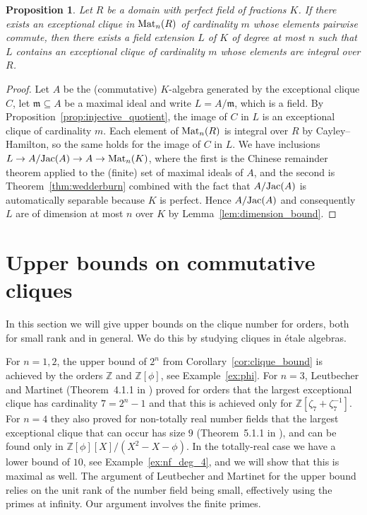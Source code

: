 \documentclass{amsart}
\theoremstyle{plain}
\newtheorem{proposition}[theorem]{Proposition}
\theoremstyle{definition}
\newcommand{\Z}{\ensuremath{\mathbb{Z}}}
\newcommand{\clq}{C}
\begin{document}
\begin{proposition}\label{prop:commutative_clique_to_nf}
	Let \(R\) be a domain with perfect field of fractions \(K\).
	If there exists an exceptional clique in \(\textup{Mat}_n(R)\) of cardinality \(m\) whose elements pairwise commute, then there exists a field extension \(L\) of \(K\) of degree at most \(n\) such that \(L\) contains an exceptional clique of cardinality \(m\) whose elements are integral over \(R\).
\end{proposition}
\begin{proof}
	Let \(A\) be the (commutative) \(K\)-algebra generated by the exceptional clique \(\clq\), let \(\mathfrak{m}\subseteq A\) be a maximal ideal and write \(L=A/\mathfrak{m}\), which is a field.
	By Proposition~\ref{prop:injective_quotient}, the image of \(\clq\) in \(L\) is an exceptional clique of cardinality \(m\).
	Each element of \(\textup{Mat}_n(R)\) is integral over \(R\) by Cayley--Hamilton, so the same holds for the image of \(\clq\) in \(L\).
	We have inclusions \(L \to A/\textup{Jac}(A)\to A \to \textup{Mat}_n(K)\), where the first is the Chinese remainder theorem applied to the (finite) set of maximal ideals of \(A\), and the second is Theorem~\ref{thm:wedderburn} combined with the fact that \(A/\textup{Jac}(A)\) is automatically separable because \(K\) is perfect. 
	Hence \(A/\textup{Jac}(A)\) and consequently \(L\) are of dimension at most \(n\) over \(K\) by Lemma~\ref{lem:dimension_bound}.
\end{proof}


\section{Upper bounds on commutative cliques}\label{sec:uppercommutative}

In this section we will give upper bounds on the clique number for orders, both for small rank and in general. We do this by studying cliques in \'etale algebras.

For \(n=1,2\), the upper bound of \(2^n\) from Corollary~\ref{cor:clique_bound} is achieved by the orders \(\Z\) and \(\Z[\phi]\), see Example~\ref{ex:phi}.
For \(n=3\), Leutbecher and Martinet (Theorem~4.1.1 in \cite{Martinet}) proved for orders that the largest exceptional clique has cardinality \(7=2^n-1\) and that this is achieved only for \(\Z[\zeta_7+\zeta_7^{-1}]\).
For \(n=4\) they also proved for non-totally real number fields that the largest exceptional clique that can occur has size \(9\) (Theorem~5.1.1 in \cite{Martinet}), and can be found only in \(\Z[\phi][X]/(X^2-X-\phi)\). In the totally-real case we have a lower bound of \(10\), see Example~\ref{ex:nf_deg_4}, and we will show that this is maximal as well.
The argument of Leutbecher and Martinet for the upper bound relies on the unit rank of the number field being small, effectively using the primes at infinity. Our argument involves the finite primes.
\end{document}
